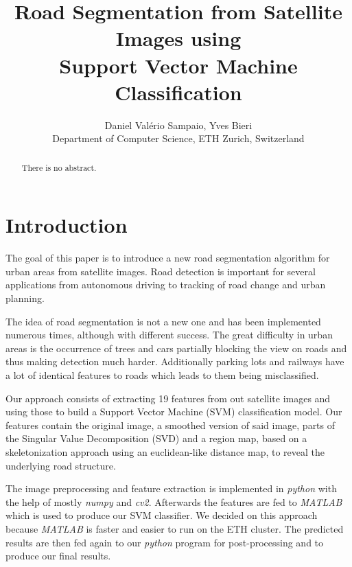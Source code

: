 \documentclass[10pt,conference,compsocconf]{IEEEtran}
\begin{document}
\title{Road Segmentation from Satellite Images using\\Support Vector Machine Classification}

\author{
  Daniel Val\'erio Sampaio, Yves Bieri\\
  Department of Computer Science, ETH Zurich, Switzerland
}

\maketitle

\begin{abstract}
There is no abstract.
\end{abstract}

\section{Introduction}

The goal of this paper is to introduce a new road segmentation algorithm for urban areas from satellite images. Road detection is important for several applications from autonomous driving to tracking
of road change and urban planning.

The idea of road segmentation is not a new one and has been implemented numerous times, although with
different success. The great difficulty in urban areas is the occurrence of trees and cars partially blocking the view on roads and thus making detection much harder. Additionally parking lots and railways have a lot of identical features to roads which leads to them being misclassified.

Our approach consists of extracting 19 features from out satellite images and using those to build a Support Vector Machine (SVM) classification model. Our features contain the original image, a smoothed version of said image, parts of the Singular Value Decomposition (SVD) and a region map, based on a skeletonization approach using an euclidean-like distance map, to reveal the underlying road structure.

The image preprocessing and feature extraction is implemented in \emph{python} with the help of mostly \emph{numpy} and \emph{cv2}. Afterwards the features are fed to \emph{MATLAB} which is used to produce our SVM classifier. We decided on this approach because \emph{MATLAB} is faster and easier to run on the ETH cluster. The predicted results are then fed again to our \emph{python} program for post-processing and to produce our final results.
\end{document}
